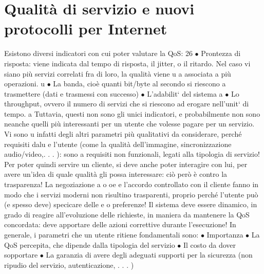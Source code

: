 \documentclass[a4paper,12pt]{article}
\begin{document}
\section{Qualità di servizio e nuovi protocolli per Internet}
Esistono diversi indicatori con cui poter valutare la QoS:
26
$\bullet$ Prontezza di risposta: viene indicata dal tempo di risposta, il jitter, o il
ritardo. Nel caso vi siano più servizi correlati fra di loro, la qualità viene
u
a
associata a più operazioni.
u
$\bullet$ La banda, cioè quanti bit/byte al secondo si riescono a trasmettere (dati
e
trasmessi con successo)
$\bullet$ L'adabilit` del sistema
a
$\bullet$ Lo throughput, ovvero il numero di servizi che si riescono ad erogare
nell'unit` di tempo.
a
Tuttavia, questi non sono gli unici indicatori, e probabilmente non sono neanche
quelli più interessanti per un utente che volesse pagare per un servizio. Vi sono
u
infatti degli altri parametri più qualitativi da considerare, perché requisiti dalu
e
l'utente (come la qualità dell'immagine, sincronizzazione audio/video,. . . ): sono
a
requisiti non funzionali, legati alla tipologia di servizio! Per poter quindi servire
un cliente, si deve anche poter interagire con lui, per avere un'idea di quale
qualità gli possa interessare: ciò però è contro la trasparenza! La negoziazione
a
o
oe
e l'accordo controllato con il cliente fanno in modo che i servizi moderni non
risultino trasparenti, proprio perché l'utente può (e spesso deve) specicare delle
e
o
preferenze! Il sistema deve essere dinamico, in grado di reagire all'evoluzione
delle richieste, in maniera da mantenere la QoS concordata: deve apportare
delle azioni correttive durante l'esecuzione! In generale, i parametri che un
utente ritiene fondamentali sono:
$\bullet$ Importanza
$\bullet$ La QoS percepita, che dipende dalla tipologia del servizio
$\bullet$ Il costo da dover sopportare
$\bullet$ La garanzia di avere degli adeguati supporti per la sicurezza (non ripudio
del servizio, autenticazione, . . . )
\end{document}

